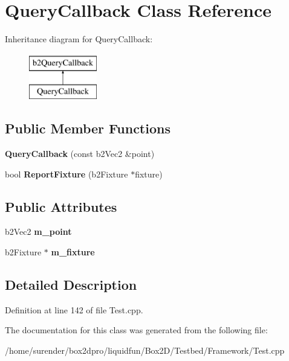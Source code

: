 \hypertarget{classQueryCallback}{\section{Query\-Callback Class Reference}
\label{classQueryCallback}
}
Inheritance diagram for Query\-Callback\-:\begin{figure}[H]
\begin{center}
\leavevmode
\includegraphics[height=2.000000cm]{classQueryCallback}
\end{center}
\end{figure}
\subsection*{Public Member Functions}
\begin{DoxyCompactItemize}
\item 
\hypertarget{classQueryCallback_a9c15d04aa8895b319f93e6c9af1c59f6}{{\bfseries Query\-Callback} (const b2\-Vec2 \&point)}\label{classQueryCallback_a9c15d04aa8895b319f93e6c9af1c59f6}

\item 
\hypertarget{classQueryCallback_ac79cf9e2008bdea68ab3d9d64811dc62}{bool {\bfseries Report\-Fixture} (b2\-Fixture $\ast$fixture)}\label{classQueryCallback_ac79cf9e2008bdea68ab3d9d64811dc62}

\end{DoxyCompactItemize}
\subsection*{Public Attributes}
\begin{DoxyCompactItemize}
\item 
\hypertarget{classQueryCallback_a40f98612c1a6d7eeb57a3451b4898cda}{b2\-Vec2 {\bfseries m\-\_\-point}}\label{classQueryCallback_a40f98612c1a6d7eeb57a3451b4898cda}

\item 
\hypertarget{classQueryCallback_acf7997f35f4f35b82a2aa6a9b3bd66db}{b2\-Fixture $\ast$ {\bfseries m\-\_\-fixture}}\label{classQueryCallback_acf7997f35f4f35b82a2aa6a9b3bd66db}

\end{DoxyCompactItemize}


\subsection{Detailed Description}


Definition at line 142 of file Test.\-cpp.



The documentation for this class was generated from the following file\-:\begin{DoxyCompactItemize}
\item 
/home/surender/box2dpro/liquidfun/\-Box2\-D/\-Testbed/\-Framework/Test.\-cpp\end{DoxyCompactItemize}
